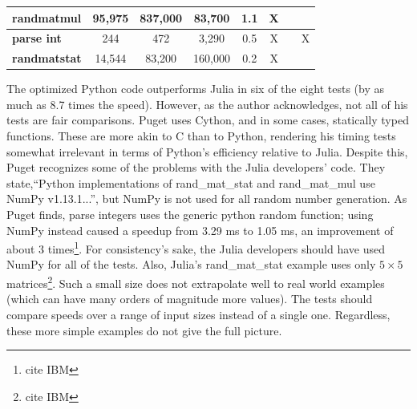 \documentclass[10pt]{article}
\begin{document}
\begin{table}[ht]
\begin{tabular}{|l|c|c|c|c|c|c|c|}
\textbf{randmatmul}          & 95,975         & 837,000                                                          & 83,700                                                               & 1.1                                                                         & X              &                &                 \\ \hline
\textbf{parse int}           & 244            & 472                                                              & 3,290                                                                & 0.5                                                                         & X              &                & X               \\ \hline
\textbf{randmatstat}         & 14,544         & 83,200                                                           & 160,000                                                              & 0.2                                                                         & X              &                &                 \\ \hline
\end{tabular}
\end{table}

The optimized Python code outperforms Julia in six of the eight tests (by as much as 8.7 times the speed). However, as the author acknowledges, not all of his tests are fair comparisons. Puget uses Cython, and in some cases, statically typed functions. These are more akin to C than to Python, rendering his timing tests somewhat irrelevant in terms of Python's efficiency relative to Julia. Despite this, Puget recognizes some of the problems with the Julia developers' code. They state,``Python implementations of rand\_mat\_stat and rand\_mat\_mul use NumPy v1.13.1...'', but NumPy is not used for all random number generation. As Puget finds, parse integers uses the generic python random function; using NumPy instead caused a speedup from 3.29 ms to 1.05 ms, an improvement of about 3 times\footnote{cite IBM}. For consistency's sake, the Julia developers should have used NumPy for all of the tests. Also, Julia's rand\_mat\_stat example uses only $5 \times 5$ matrices\footnote{cite IBM}. Such a small size does not extrapolate well to real world examples (which can have many orders of magnitude more values). The tests should compare speeds over a range of input sizes instead of a single one. Regardless, these more simple examples do not give the full picture.
\end{document}
